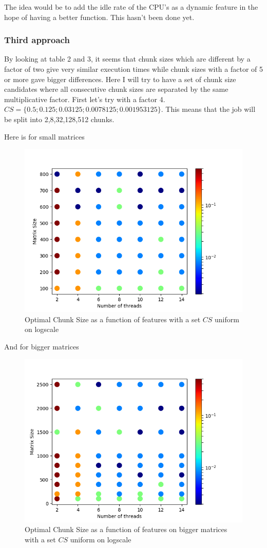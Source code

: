 \documentclass[12pt]{article}
\begin{document}
The idea would be to add the idle rate of the CPU's as a dynamic feature in the hope of having a better function.
This hasn't been done yet.

\subsubsection{Third approach}
By looking at table 2 and 3, it seems that chunk sizes which are different by a factor of two give very similar execution times while chunk sizes with a factor of 5 or more gave bigger differences. Here I will try to have a set of chunk size candidates where all consecutive chunk sizes are separated by the same multiplicative factor. First let's try with a factor 4. $CS=\{0.5;0.125;0.03125;0.0078125;0.001953125\}$. This means that the job will be split into 2,8,32,128,512 chunks.

Here is for small matrices

\begin{figure}[H]
	\centering
	\includegraphics[width=120mm]{function_uniform_log.png}
	\caption{Optimal Chunk Size as a function of features with a set $CS$ uniform on logscale}
\end{figure}

And for bigger matrices
\begin{figure}[H]
	\centering
	\includegraphics[width=120mm]{function_big_uniform_log.png}
	\caption{Optimal Chunk Size as a function of features on bigger matrices with a set $CS$ uniform on logscale }
\end{figure}
\end{document}
